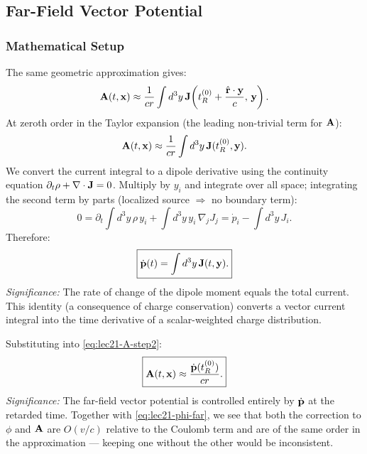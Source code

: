 \subsection{Far-Field Vector Potential}
\label{subsec:lec21-farfield-A}

\subsubsection*{Mathematical Setup}
The same geometric approximation gives:
\begin{equation}\label{eq:lec21-A-step1}
  \mathbf{A}(t,\mathbf{x}) \approx \frac{1}{cr}
  \int d^3y\,\mathbf{J}\!\left(t_R^{(0)}+\frac{\hat{\mathbf{r}}\cdot\mathbf{y}}{c},\,\mathbf{y}\right).
\end{equation}
At zeroth order in the Taylor expansion (the leading non-trivial term for $\mathbf{A}$):
\begin{equation}\label{eq:lec21-A-step2}
  \mathbf{A}(t,\mathbf{x}) \approx \frac{1}{cr}\int d^3y\,\mathbf{J}(t_R^{(0)},\mathbf{y}).
\end{equation}
We convert the current integral to a dipole derivative using the continuity equation
$\partial_t\rho + \nabla \cdot\mathbf{J} = 0$. Multiply by $y_i$ and integrate over all space;
integrating the second term by parts (localized source $\Rightarrow$ no boundary term):
\[
  0 = \partial_t\!\int d^3y\,\rho\,y_i + \int d^3y\,y_i\,\nabla_j J_j
    = \dot{p}_i - \int d^3y\,J_i.
\]
Therefore:
\begin{equation}\label{eq:lec21-dpdt-J}
  \boxed{\dot{\mathbf{p}}(t) = \int d^3y\,\mathbf{J}(t,\mathbf{y}).}
\end{equation}
\textit{Significance:} The rate of change of the dipole moment equals the total current.
This identity (a consequence of charge conservation) converts a vector current integral
into the time derivative of a scalar-weighted charge distribution.

Substituting into \eqref{eq:lec21-A-step2}:
\begin{equation}\label{eq:lec21-A-far}
  \boxed{\mathbf{A}(t,\mathbf{x}) \approx \frac{\dot{\mathbf{p}}(t_R^{(0)})}{cr}.}
\end{equation}
\textit{Significance:} The far-field vector potential is controlled entirely by
$\dot{\mathbf{p}}$ at the retarded time. Together with \eqref{eq:lec21-phi-far}, we
see that both the correction to $\phi$ and $\mathbf{A}$ are $O(v/c)$ relative to the
Coulomb term and are of the same order in the approximation --- keeping one without
the other would be inconsistent.

